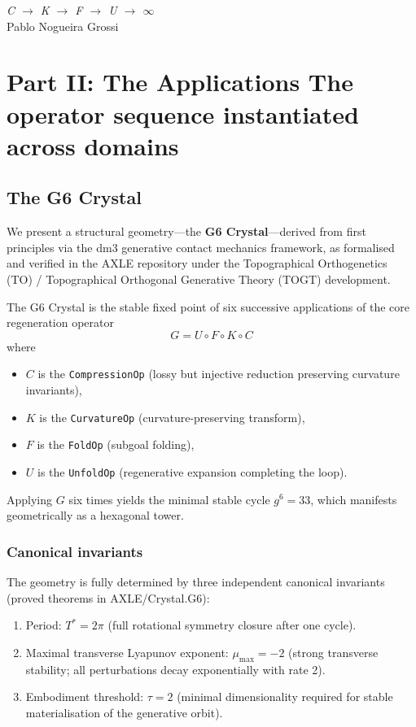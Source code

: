 \documentclass[19pt]{book}
\theoremstyle{plain}
\theoremstyle{definition}
\theoremstyle{remark}
\begin{document}
\bigskip
\begin{flushright}
\textit{C \;$\to$\; K \;$\to$\; F \;$\to$\; U \;$\to$\; $\infty$}\\[0.3em]
Pablo Nogueira Grossi\\
\end{flushright}
\part{Part II: The Applications \break The operator sequence instantiated across domains}
\chapter{The G6 Crystal}
We present a structural geometry---the \textbf{G6 Crystal}---derived from first principles via the dm3 generative contact mechanics framework, as formalised and verified in the AXLE repository under the Topographical Orthogenetics (TO) / Topographical Orthogonal Generative Theory (TOGT) development.

The G6 Crystal is the stable fixed point of six successive applications of the core regeneration operator
\[
G = U \circ F \circ K \circ C
\]
where
\begin{itemize}
\item $C$ is the \texttt{CompressionOp} (lossy but injective reduction preserving curvature invariants),
\item $K$ is the \texttt{CurvatureOp} (curvature-preserving transform),
\item $F$ is the \texttt{FoldOp} (subgoal folding),
\item $U$ is the \texttt{UnfoldOp} (regenerative expansion completing the loop).
\end{itemize}
Applying $G$ six times yields the minimal stable cycle $g^6 = 33$, which manifests geometrically as a hexagonal tower.

\section{Canonical invariants}

The geometry is fully determined by three independent canonical invariants (proved theorems in AXLE/Crystal.G6):
\begin{enumerate}
\item Period: $T^* = 2\pi$ (full rotational symmetry closure after one cycle).
\item Maximal transverse Lyapunov exponent: $\mu_{\max} = -2$ (strong transverse stability; all perturbations decay exponentially with rate 2).
\item Embodiment threshold: $\tau = 2$ (minimal dimensionality required for stable materialisation of the generative orbit).
\end{enumerate}
\end{document}
